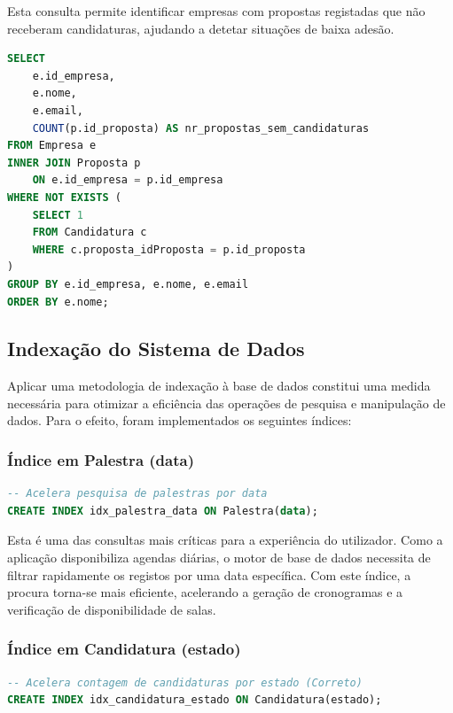 \documentclass[12pt,a4paper]{article}
\begin{document}
Esta consulta permite identificar empresas com propostas registadas que não
receberam candidaturas, ajudando a detetar situações de baixa adesão.

\begin{lstlisting}[language=SQL,caption={Comando SQL que traduz o RM10}, label={lst:roles}]
SELECT 
    e.id_empresa,
    e.nome,
    e.email,
    COUNT(p.id_proposta) AS nr_propostas_sem_candidaturas
FROM Empresa e
INNER JOIN Proposta p 
    ON e.id_empresa = p.id_empresa
WHERE NOT EXISTS (
    SELECT 1 
    FROM Candidatura c 
    WHERE c.proposta_idProposta = p.id_proposta
)
GROUP BY e.id_empresa, e.nome, e.email
ORDER BY e.nome;
\end{lstlisting}
\newpage

\subsection{Indexação do Sistema de Dados}
Aplicar uma metodologia de indexação à base de dados constitui uma medida 
necessária para otimizar a eficiência das operações de pesquisa e manipulação 
de dados. Para o efeito, foram implementados os seguintes índices:



\subsubsection{Índice em Palestra (data)}
\begin{lstlisting}[language=SQL,caption={Criação de Índices para Otimização}, label={lst:roles}]
-- Acelera pesquisa de palestras por data
CREATE INDEX idx_palestra_data ON Palestra(data);
\end{lstlisting}

Esta é uma das consultas mais críticas para a experiência do utilizador. Como a aplicação disponibiliza agendas diárias, o motor de base de dados necessita de filtrar rapidamente os registos por uma data específica. Com este índice, a procura torna-se mais eficiente, acelerando a geração de cronogramas e a verificação de disponibilidade de salas.

\subsubsection{Índice em Candidatura (estado)}
\begin{lstlisting}[language=SQL,caption={Criação de Índices para Otimização}, label={lst:roles}]
-- Acelera contagem de candidaturas por estado (Correto)
CREATE INDEX idx_candidatura_estado ON Candidatura(estado);
\end{lstlisting}
\end{document}
